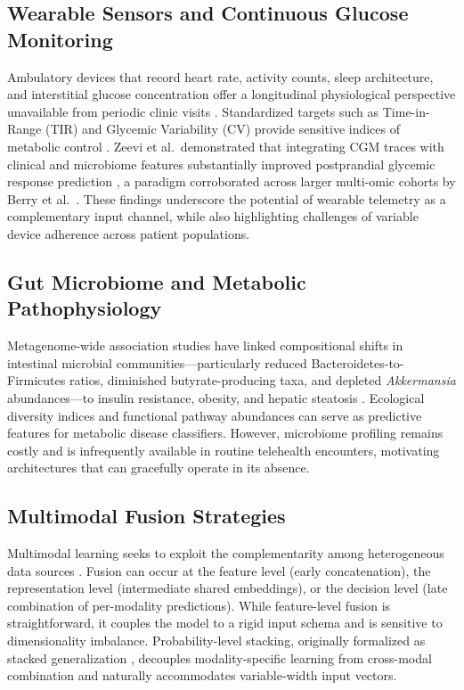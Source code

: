 \documentclass[10pt,twocolumn,letterpaper]{article}
\begin{document}
\subsection{Wearable Sensors and Continuous Glucose Monitoring}
Ambulatory devices that record heart rate, activity counts, sleep architecture, and interstitial glucose concentration offer a longitudinal physiological perspective unavailable from periodic clinic visits \citep{hall2018glucotypes, dunn2021wearable}. Standardized targets such as Time-in-Range (TIR) and Glycemic Variability (CV) provide sensitive indices of metabolic control \citep{battelino2019clinical}. Zeevi et al.\ demonstrated that integrating CGM traces with clinical and microbiome features substantially improved postprandial glycemic response prediction \citep{zeevi2015personalized}, a paradigm corroborated across larger multi-omic cohorts by Berry et al.\ \citep{berry2020human}. These findings underscore the potential of wearable telemetry as a complementary input channel, while also highlighting challenges of variable device adherence across patient populations.

\subsection{Gut Microbiome and Metabolic Pathophysiology}
Metagenome-wide association studies have linked compositional shifts in intestinal microbial communities---particularly reduced Bacteroidetes-to-Firmicutes ratios, diminished butyrate-producing taxa, and depleted \textit{Akkermansia} abundances---to insulin resistance, obesity, and hepatic steatosis \citep{qin2012metagenome, turnbaugh2006obesity, cani2019supplementation, aron2020gut, leclercq2014intestinal}. Ecological diversity indices and functional pathway abundances can serve as predictive features for metabolic disease classifiers. However, microbiome profiling remains costly and is infrequently available in routine telehealth encounters, motivating architectures that can gracefully operate in its absence.

\subsection{Multimodal Fusion Strategies}
Multimodal learning seeks to exploit the complementarity among heterogeneous data sources \citep{huang2020multimodal, kline2022multimodal}. Fusion can occur at the feature level (early concatenation), the representation level (intermediate shared embeddings), or the decision level (late combination of per-modality predictions). While feature-level fusion is straightforward, it couples the model to a rigid input schema and is sensitive to dimensionality imbalance. Probability-level stacking, originally formalized as stacked generalization \citep{wolpert1992stacked}, decouples modality-specific learning from cross-modal combination and naturally accommodates variable-width input vectors.
\end{document}
